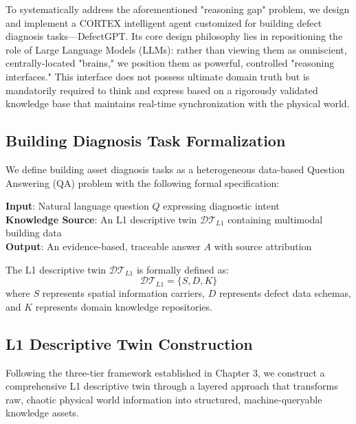 To systematically address the aforementioned "reasoning gap" problem, we design and implement a CORTEX intelligent agent customized for building defect diagnosis tasks—DefectGPT. Its core design philosophy lies in repositioning the role of Large Language Models (LLMs): rather than viewing them as omniscient, centrally-located "brains," we position them as powerful, controlled "reasoning interfaces." This interface does not possess ultimate domain truth but is mandatorily required to think and express based on a rigorously validated knowledge base that maintains real-time synchronization with the physical world.

\subsection{Building Diagnosis Task Formalization}

We define building asset diagnosis tasks as a heterogeneous data-based Question Answering (QA) problem with the following formal specification:

\textbf{Input}: Natural language question $Q$ expressing diagnostic intent\\
\textbf{Knowledge Source}: An L1 descriptive twin $\mathcal{DT}_{L1}$ containing multimodal building data\\
\textbf{Output}: An evidence-based, traceable answer $A$ with source attribution

The L1 descriptive twin $\mathcal{DT}_{L1}$ is formally defined as:
\begin{equation}
\mathcal{DT}_{L1} = \{S, D, K\}
\end{equation}
where $S$ represents spatial information carriers, $D$ represents defect data schemas, and $K$ represents domain knowledge repositories.

\subsection{L1 Descriptive Twin Construction}

Following the three-tier framework established in Chapter 3, we construct a comprehensive L1 descriptive twin through a layered approach that transforms raw, chaotic physical world information into structured, machine-queryable knowledge assets.

